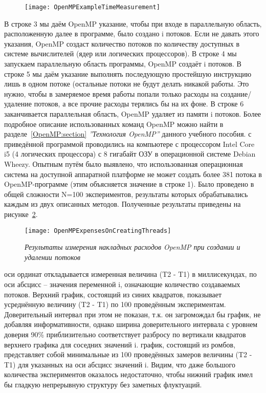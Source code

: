 {	\begin{figure}[H]
		\texttt{[image: OpenMPExampleTimeMeasurement]}
		\label{OpenMPExampleTimeMeasurement:image}
	\end{figure}
	В строке 3 мы даём OpenMP указание, чтобы при входе в параллельную область, расположенную далее в программе, было создано i потоков. Если не давать этого указания, OpenMP создаст количество потоков по количеству доступных в системе вычислителей (ядер или логических процессоров). В строке 4 мы запускаем параллельную область программы, OpenMP создаёт i потоков. В строке 5 мы даём указание выполнять последующую простейшую инструкцию лишь в одном потоке (остальные потоки не будут делать никакой работы. Это нужно, чтобы в замеряемое время работы попали только расходы на создание/удаление потоков, а все прочие расходы терялись бы на их фоне. В строке 6 заканчивается параллельная область, OpenMP удаляет из памяти i потоков. Более подробное описание использованных команд OpenMP можно найти в разделе~\ref{OpenMP:section} \textit{''Технология OpenMP''} данного учебного  пособия.
	 с приведённой программой проводились на компьютере с процессором Intel Core i5 (4 логических процессора) с 8 гигабайт ОЗУ в операционной системе Debian Wheezy. Опытным путём было выявлено, что использованная операционная система на доступной аппаратной платформе не может создать более 381 потока в OpenMP-программе (этим объясняется значение в строке 1). Было проведено в общей сложности N=100 экспериментов, результаты которых обрабатывались каждым из двух описанных методов. Полученные результаты приведены на рисунке~\ref{OpenMPExpensesOnCreatingThreads:image}.
	\begin{figure}[H]
		\texttt{[image: OpenMPExpensesOnCreatingThreads]}
		\caption{\textit{Результаты измерения накладных расходов OpenMP при создании и удалении потоков}}
		\label{OpenMPExpensesOnCreatingThreads:image}
	\end{figure} 
	 оси ординат откладывается измеренная величина (T2 - T1) в миллисекундах, по оси абсцисс – значения переменной i, означающие количество создаваемых потоков. Верхний график, состоящий из синих квадратов, показывает усреднённую величину (T2 - T1) по 100 проведённым экспериментам. Доверительный интервал при этом не показан, т.к. он загромождал бы график, не добавляя информативности, однако ширина доверительного интервала с уровнем доверия 90\% приблизительно соответствует разбросу по вертикали квадратов верхнего графика для соседних значений i. 
	 график, состоящий из ромбов, представляет собой минимальные из 100 проведённых замеров величины (T2 -  T1) для указанных на оси абсцисс значений i. Видим, что даже большого количества экспериментов оказалось недостаточно, чтобы нижний график имел бы гладкую непрерывную структуру без заметных флуктуаций.

}